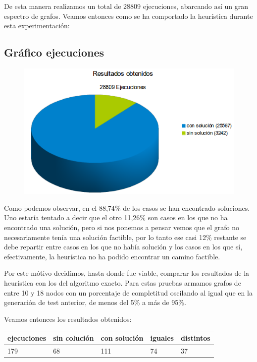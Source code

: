 De esta manera realizamos un total de 28809 ejecuciones, abarcando as\'i un gran espectro de grafos. Veamos entonces como se ha comportado la heur\'istica durante esta experimentaci\'on:

\subsection{Gr\'afico ejecuciones}
\begin{figure}[!hp]
	\centering
 	\includegraphics[scale=0.7]{img/greedy_soluciones.png}
\end{figure}



Como podemos observar, en el 88,74\% de los casos se han encontrado soluciones.
Uno estar\'ia tentado a decir que el otro 11,26\% son casos en los que no ha encontrado una soluci\'on, pero si nos ponemos a pensar vemos que el grafo no necesariamente ten\'ia una soluci\'on factible, por lo tanto ese casi 12\% restante se debe repartir entre casos en los que no hab\'ia soluci\'on y los casos en los que s\'i, efectivamente, la heur\'istica no ha podido encontrar un camino factible.

Por este m\'otivo decidimos, hasta donde fue viable, comparar los resultados de la heur\'istica con los del algoritmo exacto. 
Para estas pruebas armamos grafos de entre 10 y 18 nodos con un porcentaje de completitud oscilando al igual que en la generaci\'on de test anterior, de menos del 5\% a m\'as de 95\%.

Veamos entonces los resultados obtenidos:
\\


\begin{tabular}{ | l | l | l | l | l | }
\hline
ejecuciones & sin coluci\'on & con soluci\'on & iguales & distintos \\
\hline
179 & 68 & 111 & 74 & 37 \\
\hline
\end{tabular}


